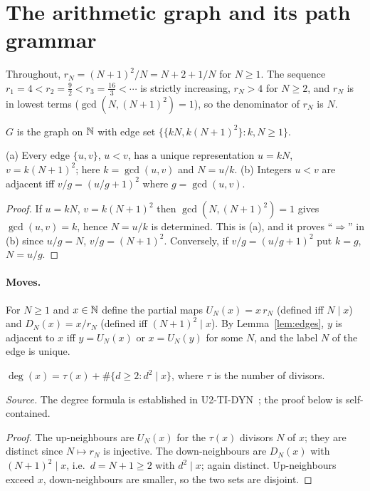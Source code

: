 \section{The arithmetic graph and its path grammar}\label{sec:graph}

Throughout, $r_N=(N+1)^2/N=N+2+1/N$ for $N\ge1$. The sequence $r_1=4<r_2=\tfrac92<r_3=\tfrac{16}{3}<\cdots$ is strictly increasing, $r_N>4$ for $N\ge2$, and $r_N$ is in lowest terms ($\gcd(N,(N+1)^2)=1$), so the denominator of $r_N$ is $N$.

\begin{definition}\label{def:G}
$G$ is the graph on $\mathbb{N}$ with edge set $\{\{kN,k(N+1)^2\}:k,N\ge1\}$.
\end{definition}

\begin{lemma}\label{lem:edges}
(a) Every edge $\{u,v\}$, $u<v$, has a unique representation $u=kN$, $v=k(N+1)^2$; here $k=\gcd(u,v)$ and $N=u/k$.
(b) Integers $u<v$ are adjacent iff $v/g=(u/g+1)^2$ where $g=\gcd(u,v)$.
\end{lemma}
\begin{proof}
If $u=kN$, $v=k(N+1)^2$ then $\gcd(N,(N+1)^2)=1$ gives $\gcd(u,v)=k$, hence $N=u/k$ is determined. This is (a), and it proves ``$\Rightarrow$'' in (b) since $u/g=N$, $v/g=(N+1)^2$. Conversely, if $v/g=(u/g+1)^2$ put $k=g$, $N=u/g$. \qedhere
\end{proof}

\paragraph{Moves.}
For $N\ge1$ and $x\in\mathbb{N}$ define the partial maps $U_N(x)=x\,r_N$ (defined iff $N\mid x$) and $D_N(x)=x/r_N$ (defined iff $(N+1)^2\mid x$). By Lemma~\ref{lem:edges}, $y$ is adjacent to $x$ iff $y=U_N(x)$ or $x=U_N(y)$ for some $N$, and the label $N$ of the edge is unique.

\begin{proposition}[Degree]\label{prop:degree}
$\deg(x)=\tau(x)+\#\{d\ge2:d^2\mid x\}$, where $\tau$ is the number of divisors.
\end{proposition}
\noindent\emph{Source.} The degree formula is established in U2-TI-DYN~\cite{UTI}; the proof below is self-contained.
\begin{proof}
The up-neighbours are $U_N(x)$ for the $\tau(x)$ divisors $N$ of $x$; they are distinct since $N\mapsto r_N$ is injective. The down-neighbours are $D_N(x)$ with $(N+1)^2\mid x$, i.e.\ $d=N+1\ge2$ with $d^2\mid x$; again distinct. Up-neighbours exceed $x$, down-neighbours are smaller, so the two sets are disjoint. \qedhere
\end{proof}

